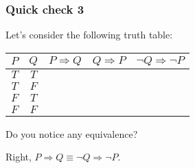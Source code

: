 \begin{frame}\frametitle{Quick check 3}
  Let's consider the following truth table:
  \begin{tcolorbox}
    \begin{tabular}{|c|c||c|c|c|}
      \hline
      $P$ & $Q$ & $P\Rightarrow Q$ & $Q\Rightarrow P$ & $\neg Q \Rightarrow \neg P$ \\
      \hline
      $T$ & $T$ & & & \\
      $T$ & $F$ & & & \\
      $F$ & $T$ & & & \\
      $F$ & $F$ & & & \\
      \hline
    \end{tabular}
  \end{tcolorbox}
  \pause
  Do you notice any equivalence?
  \pause

  Right, $P\Rightarrow Q\equiv \neg Q\Rightarrow\neg P$.
\end{frame}

